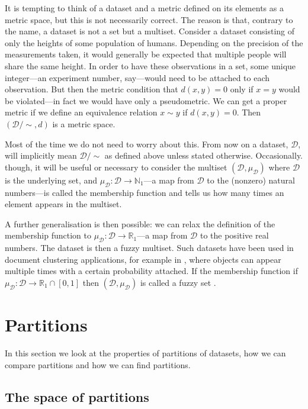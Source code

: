 \documentclass[a4paper]{report}
\newcommand{\dset}{\mathcal{D}}
\begin{document}
It is tempting to think of a dataset and a metric defined on its elements as a
metric space, but this is not necessarily correct.  The reason is that,
contrary to the name, a dataset is not a set but a multiset.  Consider a
dataset consisting of only the heights of some population of humans.
Depending on the precision of the measurements taken, it would generally be
expected that multiple people will share the same height.  In order to have
these observations in a set, some unique integer---an experiment number,
say---would need to be attached to each observation.  But then the metric
condition that $d(x,y)=0$ only if $x=y$ would be violated---in fact we would
have only a pseudometric.  We can get a proper metric if we define an
equivalence relation $x \sim y$ if $d(x,y)=0$.  Then $(\dset/\sim,d)$ is a
metric space.

Most of the time we do not need to worry about this.  From now on a dataset,
$\dset$, will implicitly mean $\dset/\sim$ as defined above unless stated
otherwise.  Occasionally. though, it will be useful or necessary to consider
the multiset $(\dset,\mu_{\dset})$ where $\dset$ is the underlying set, and
$\mu_{\dset} \colon \dset \to \mathbb{N}_1$---a map from $\dset$ to the
(nonzero) natural numbers---is called the membership function and tells us how
many times an element appears in the multiset.

A further generalisation is then possible: we can relax the definition of the
membership function to $\mu_{\dset} \colon \dset \to \mathbb{R}_1$---a map
from $\dset$ to the positive real numbers.  The dataset is then a fuzzy
multiset.  Such datasets have been used in document clustering applications,
for example in \citep{miyamoto2003information}, where objects can appear
multiple times with a certain probability attached.  If the membership
function if $\mu_{\dset} \colon \dset \to \mathbb{R}_1 \cap [0,1]$ then
$(\dset,\mu_{\dset})$ is called a fuzzy set
\citep{zadeh1965fuzzy,gottwald2010fuzzy}.

\section{Partitions}
\label{sec:partitions}

In this section we look at the properties of partitions of datasets, how we
can compare partitions and how we can find partitions.

\subsection{The space of partitions}
\label{sec:space-partitions}
\end{document}
